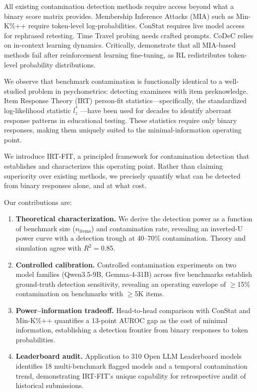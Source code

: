 \documentclass[11pt,a4paper]{article}
\begin{document}
All existing contamination detection methods require access beyond what a binary score matrix provides.
Membership Inference Attacks (MIA) such as Min-K\%++ \citep{shi2024detecting} require token-level log-probabilities.
ConStat \citep{dekoninck2024constat} requires live model access for rephrased retesting.
Time Travel probing \citep{oren2024proving} needs crafted prompts.
CoDeC \citep{shi2026codec} relies on in-context learning dynamics.
Critically, \citet{wang2025postrl} demonstrate that all MIA-based methods fail after reinforcement learning fine-tuning, as RL redistributes token-level probability distributions.

We observe that benchmark contamination is functionally identical to a well-studied problem in psychometrics: detecting examinees with item preknowledge.
Item Response Theory (IRT) person-fit statistics---specifically, the standardized log-likelihood statistic $l_{z}^{*}$ \citep{snijders2001}---have been used for decades to identify aberrant response patterns in educational testing.
These statistics require only binary responses, making them uniquely suited to the minimal-information operating point.

We introduce \textsc{IRT-FIT}, a principled framework for contamination detection that establishes and characterizes this operating point.
Rather than claiming superiority over existing methods, we precisely quantify what can be detected from binary responses alone, and at what cost.

Our contributions are:
\begin{enumerate}
    \item \textbf{Theoretical characterization.} We derive the detection power as a function of benchmark size ($n_\text{items}$) and contamination rate, revealing an inverted-U power curve with a detection trough at 40--70\% contamination. Theory and simulation agree with $R^2=0.85$.
    \item \textbf{Controlled calibration.} Controlled contamination experiments on two model families (Qwen3.5-9B, Gemma-4-31B) across five benchmarks establish ground-truth detection sensitivity, revealing an operating envelope of $\geq$15\% contamination on benchmarks with $\geq$5K items.
    \item \textbf{Power--information tradeoff.} Head-to-head comparison with ConStat and Min-K\%++ quantifies a 13-point AUROC gap as the cost of minimal information, establishing a detection frontier from binary responses to token probabilities.
    \item \textbf{Leaderboard audit.} Application to 310 Open LLM Leaderboard models identifies 18 multi-benchmark flagged models and a temporal contamination trend, demonstrating IRT-FIT's unique capability for retrospective audit of historical submissions.
\end{enumerate}
\end{document}
